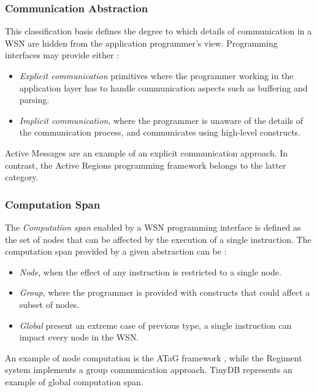 \subsubsection{Communication Abstraction}

This classification basis defines the degree to which details of communication
in a WSN are hidden from the application programmer's view. Programming
interfaces may provide either \cite{mottola_middleware:2008}:
\begin{itemize}
  \item \emph{Explicit communication} primitives where the
  programmer working in the application layer has to handle communication
  aspects such as buffering and parsing. 
  \item \emph{Implicit communication}, where the programmer is unaware of the
  details of the communication process, and communicates using
  high-level constructs.
\end{itemize}

Active Messages \cite{activemessagesEicken:2001} are an example of
an explicit communication approach. In contrast, the Active Regions programming
framework \cite{activeregions:2004} belongs to the latter category.

\subsubsection{Computation Span}

The \emph{Computation span} enabled by a WSN programming interface is defined
as the set of nodes that can be affected by the execution of a single
instruction. The
computation span provided by a given abstraction can be
\cite{mottola_middleware:2008}:

\begin{itemize}
  \item \emph{Node}, when the effect of any instruction is restricted to a
  single node.
  \item \emph{Group}, where the programmer is provided with constructs that
  could affect a subset of nodes. 
  \item \emph{Global} present an extreme case of previous type, a single
  instruction can impact every node in the WSN.
\end{itemize}

An example of node computation is the ATaG framework \cite{atag:2005}, while the
Regiment system \cite{regiment:2007} implements a group communication approach.
TinyDB \cite{madden_TinyDB:2005} represents an example of global computation
span.

